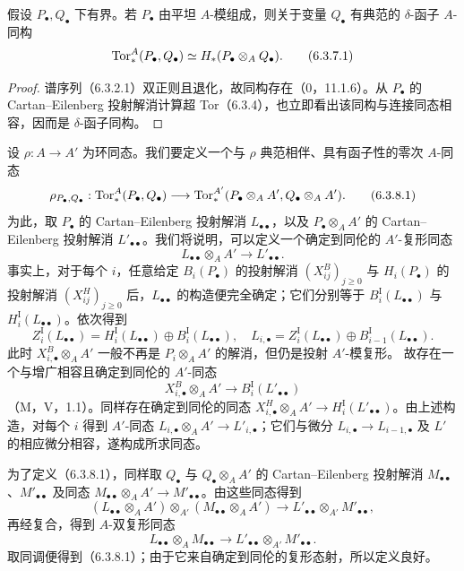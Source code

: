 假设 $P_\bullet,Q_\bullet$ 下有界。若 $P_\bullet$ 由平坦 $A$-模组成，则关于变量 $Q_\bullet$ 有典范的 $\delta$-函子 $A$-同构
\begin{equation}
 \operatorname{Tor}_*^A(P_\bullet,Q_\bullet)\simeq H_*(P_\bullet\otimes_AQ_\bullet).\tag{6.3.7.1}
\end{equation}
\begin{proof}
谱序列（6.3.2.1）双正则且退化，故同构存在（0，11.1.6）。从 $P_\bullet$ 的 Cartan--Eilenberg 投射解消计算超 Tor（6.3.4），也立即看出该同构与连接同态相容，因而是 $\delta$-函子同构。
\end{proof}

设 $\rho:A\to A'$ 为环同态。我们要定义一个与 $\rho$ 典范相伴、具有函子性的零次 $A$-同态
\begin{equation}
 \rho_{P_\bullet,Q_\bullet}:\operatorname{Tor}_*^A(P_\bullet,Q_\bullet)
 \longrightarrow\operatorname{Tor}_*^{A'}(P_\bullet\otimes_AA',Q_\bullet\otimes_AA').\tag{6.3.8.1}
\end{equation}
为此，取 $P_\bullet$ 的 Cartan--Eilenberg 投射解消 $L_{\bullet\bullet}$，以及 $P_\bullet\otimes_AA'$ 的 Cartan--Eilenberg 投射解消 $L'_{\bullet\bullet}$。我们将说明，可以定义一个确定到同伦的 $A'$-复形同态
\[
 L_{\bullet\bullet}\otimes_AA'\longrightarrow L'_{\bullet\bullet}.
\]
事实上，对于每个 $i$，任意给定 $B_i(P_\bullet)$ 的投射解消 $(X^B_{ij})_{j\geq0}$ 与 $H_i(P_\bullet)$ 的投射解消 $(X^H_{ij})_{j\geq0}$ 后，$L_{\bullet\bullet}$ 的构造便完全确定；它们分别等于 $B_i^{\mathrm I}(L_{\bullet\bullet})$ 与 $H_i^{\mathrm I}(L_{\bullet\bullet})$。依次得到
\[
 Z_i^{\mathrm I}(L_{\bullet\bullet})
 =H_i^{\mathrm I}(L_{\bullet\bullet})\oplus B_i^{\mathrm I}(L_{\bullet\bullet}),
\quad
 L_{i,\bullet}=Z_i^{\mathrm I}(L_{\bullet\bullet})\oplus B_{i-1}^{\mathrm I}(L_{\bullet\bullet}).
\]
此时 $X^B_{i,\bullet}\otimes_AA'$ 一般不再是 $P_i\otimes_AA'$ 的解消，但仍是投射 $A'$-模复形。
故存在一个与增广相容且确定到同伦的 $A'$-同态
\[
 X^B_{i,\bullet}\otimes_AA'\longrightarrow B_i^{\mathrm I}(L'_{\bullet\bullet})
\]
（M，V，1.1）。同样存在确定到同伦的同态
$X^H_{i,\bullet}\otimes_AA'\to H_i^{\mathrm I}(L'_{\bullet\bullet})$。由上述构造，对每个 $i$ 得到 $A'$-同态 $L_{i,\bullet}\otimes_AA'\to L'_{i,\bullet}$；它们与微分 $L_{i,\bullet}\to L_{i-1,\bullet}$ 及 $L'$ 的相应微分相容，遂构成所求同态。

为了定义（6.3.8.1），同样取 $Q_\bullet$ 与 $Q_\bullet\otimes_AA'$ 的 Cartan--Eilenberg 投射解消 $M_{\bullet\bullet}$、$M'_{\bullet\bullet}$ 及同态 $M_{\bullet\bullet}\otimes_AA'\to M'_{\bullet\bullet}$。由这些同态得到
\[
 (L_{\bullet\bullet}\otimes_AA')\otimes_{A'}
 (M_{\bullet\bullet}\otimes_AA')
 \longrightarrow L'_{\bullet\bullet}\otimes_{A'}M'_{\bullet\bullet},
\]
再经复合，得到 $A$-双复形同态
\[
 L_{\bullet\bullet}\otimes_AM_{\bullet\bullet}
 \longrightarrow L'_{\bullet\bullet}\otimes_{A'}M'_{\bullet\bullet}.
\]
取同调便得到（6.3.8.1）；由于它来自确定到同伦的复形态射，所以定义良好。


